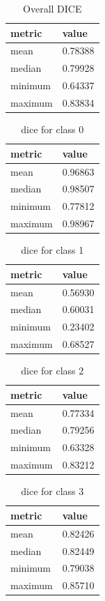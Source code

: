 \documentclass[msc]{infthesis}
\begin{document}
\begin{table}[ht]
  \centering
  \begin{tabular}[c]{ll}
  metric	& value    \\
  \hline                   
  mean 		& 0.78388  \\
  median 	& 0.79928  \\
  minimum 	& 0.64337  \\
  maximum 	& 0.83834  \\
  \end{tabular}
\caption{Overall DICE}
\end{table}

\begin{table}[ht]
  \centering
  \begin{tabular}[c]{ll}
  metric	& value    \\
  \hline
  mean 		& 0.96863  \\
  median 	& 0.98507  \\
  minimum 	& 0.77812  \\
  maximum 	& 0.98967  \\
  \end{tabular}
  \caption{dice for class 0}
\end{table}

\begin{table}[ht]
  \centering
  \begin{tabular}[c]{ll}
  metric	& value    \\
  \hline
  mean 		& 0.56930  \\
  median 	& 0.60031  \\
  minimum 	& 0.23402  \\
  maximum 	& 0.68527  \\
  \end{tabular}
  \caption{dice for class 1}
\end{table}  

\begin{table}[ht]
  \centering
  \begin{tabular}[c]{ll}
  metric	& value    \\
  \hline
  mean 		& 0.77334  \\
  median 	& 0.79256  \\
  minimum 	& 0.63328  \\
  maximum 	& 0.83212  \\
  \end{tabular}
  \caption{dice for class 2}
\end{table}  

\begin{table}[ht]
  \centering
  \begin{tabular}[c]{ll}
  metric	& value    \\
  \hline
  mean 		& 0.82426  \\
  median 	& 0.82449  \\
  minimum 	& 0.79038  \\
  maximum 	& 0.85710  \\
  \end{tabular}
  \caption{dice for class 3}
\end{table}
\end{document}
